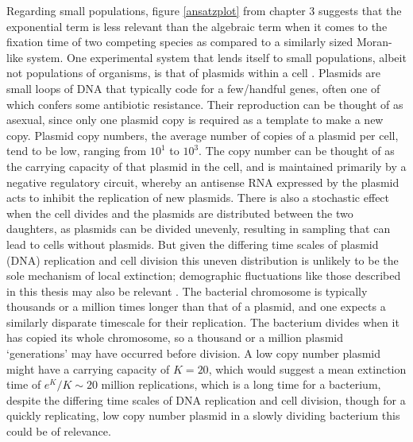 Regarding small populations, figure \ref{ansatzplot} from chapter 3 suggests that the exponential term is less relevant than the algebraic term when it comes to the fixation time of two competing species as compared to a similarly sized Moran-like system. 
One experimental system that lends itself to small populations, albeit not populations of organisms, is that of plasmids within a cell \cite{Gooding-townsend2015}. 
%
Plasmids are small loops of DNA that typically code for a few/handful genes, often one of which confers some antibiotic resistance\cite{DelSolar1998,Brock2006,VanMelderen2009}. 
Their reproduction can be thought of as asexual, since only one plasmid copy is required as a template to make a new copy. 
Plasmid copy numbers, the average number of copies of a plasmid per cell, tend to be low, ranging from $10^1$ to $10^3$. 
The copy number can be thought of as the carrying capacity of that plasmid in the cell, and is maintained primarily by a negative regulatory circuit, whereby an antisense RNA expressed by the plasmid acts to inhibit the replication of new plasmids. 
There is also a stochastic effect when the cell divides and the plasmids are distributed between the two daughters, as plasmids can be divided unevenly, resulting in sampling that can lead to cells without plasmids. 
But given the differing time scales of plasmid (DNA) replication and cell division this uneven distribution is unlikely to be the sole mechanism of local extinction; demographic fluctuations like those described in this thesis may also be relevant \cite{Elowitz2002,McMillen2002}. 
The bacterial chromosome is typically thousands or a million times longer than that of a plasmid, and one expects a similarly disparate timescale for their replication. 
The bacterium divides when it has copied its whole chromosome, so a thousand or a million plasmid `generations' may have occurred before division. 
A low copy number plasmid might have a carrying capacity of $K=20$, which would suggest a mean extinction time of $e^K/K\sim 20$ million replications, which is a long time for a bacterium, despite the differing time scales of DNA replication and cell division, though for a quickly replicating, low copy number plasmid in a slowly dividing bacterium this could be of relevance. 
